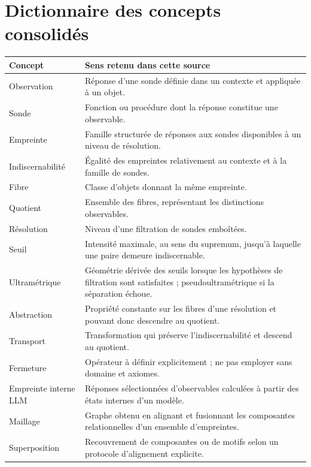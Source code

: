 \documentclass[11pt,a4paper]{article}
\theoremstyle{remark}
\newcommand{\1}{\mathbf 1}
\begin{document}
\section{Dictionnaire des concepts consolidés}

\begin{longtable}{>{\raggedright\arraybackslash}p{}>{\raggedright\arraybackslash}p{}}
\toprule
\textbf{Concept} & \textbf{Sens retenu dans cette source}\\
\midrule
Observation & Réponse d'une sonde définie dans un contexte et appliquée à un objet.\\
Sonde & Fonction ou procédure dont la réponse constitue une observable.\\
Empreinte & Famille structurée de réponses aux sondes disponibles à un niveau de résolution.\\
Indiscernabilité & Égalité des empreintes relativement au contexte et à la famille de sondes.\\
Fibre & Classe d'objets donnant la même empreinte.\\
Quotient & Ensemble des fibres, représentant les distinctions observables.\\
Résolution & Niveau d'une filtration de sondes emboîtées.\\
Seuil & Intensité maximale, au sens du supremum, jusqu'à laquelle une paire demeure indiscernable.\\
Ultramétrique & Géométrie dérivée des seuils lorsque les hypothèses de filtration sont satisfaites ; pseudoultramétrique si la séparation échoue.\\
Abstraction & Propriété constante sur les fibres d'une résolution et pouvant donc descendre au quotient.\\
Transport & Transformation qui préserve l'indiscernabilité et descend au quotient.\\
Fermeture & Opérateur à définir explicitement ; ne pas employer sans domaine et axiomes.\\
Empreinte interne LLM & Réponses sélectionnées d'observables calculées à partir des états internes d'un modèle.\\
Maillage & Graphe obtenu en alignant et fusionnant les composantes relationnelles d'un ensemble d'empreintes.\\
Superposition & Recouvrement de composantes ou de motifs selon un protocole d'alignement explicite.\\

\end{longtable}
\end{document}
